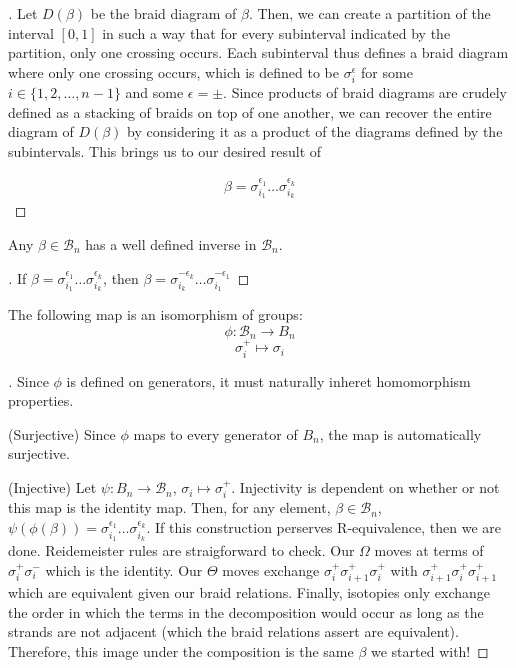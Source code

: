 \noindent \begin{proof}[\cite{Kassel}] Let $D(\beta)$ be the braid diagram of $\beta$. Then, we can create a partition of the interval $[0,1]$ in such a way that for every subinterval indicated by the partition, only one crossing occurs. Each subinterval thus defines a braid diagram where only one crossing occurs, which is defined to be $\sigma_i^\epsilon$ for some $i\in\{1,2,\hdots,n-1\}$ and some $\epsilon = \pm$. Since products of braid diagrams are crudely defined as a stacking of braids on top of one another, we can recover the entire diagram of $D(\beta)$ by considering it as a product of the diagrams defined by the subintervals. This brings us to our desired result of 

\begin{equation}
\begin{aligned}
\beta = \sigma^{\epsilon_1}_{i_1}\hdots\sigma^{\epsilon_k}_{i_k}  
\end{aligned}
\end{equation}
\end{proof}

\begin{corrolary}
	Any $\beta\in\mathcal{B}_n$ has a well defined inverse in $\mathcal{B}_n$.
\end{corrolary}

\noindent\begin{proof}[\cite{Kassel}] If $\beta = \sigma^{\epsilon_1}_{i_1}\hdots\sigma^{\epsilon_k}_{i_k}$, then $\beta = \sigma^{-\epsilon_k}_{i_k}\hdots\sigma^{-\epsilon_1}_{i_1}$ \end{proof} 

\begin{theorem}
	The following map is an isomorphism of groups:
$$\phi:\mathcal{B}_n\rightarrow B_n$$
$$\sigma_i^+ \mapsto \sigma_i$$
\end{theorem}

\noindent\begin{proof}[\cite{Kassel}] Since $\phi$ is defined on generators, it must naturally inheret homomorphism properties. 

(Surjective) Since $\phi$ maps to every generator of $B_n$, the map is automatically surjective.

(Injective) Let $\psi:B_n\rightarrow\mathcal{B}_n$, $\sigma_i\mapsto\sigma_i^+$. Injectivity is dependent on whether or not this map is the identity map. Then, for any element, $\beta\in\mathcal{B}_n$, $\psi(\phi(\beta)) = \sigma^{\epsilon_1}_{i_1}\hdots\sigma^{\epsilon_k}_{i_k}$. If this construction perserves R-equivalence, then we are done. Reidemeister rules are straigforward to check. Our $\Omega$ moves at terms of $\sigma_i^+\sigma_i^-$ which is the identity. Our $\Theta$ moves exchange $\sigma_i^+\sigma_{i+1}^+\sigma_i^+$ with $\sigma_{i+1}^+\sigma_i^+\sigma_{i+1}^+$ which are equivalent given our braid relations. Finally, isotopies only exchange the order in which the terms in the decomposition would occur as long as the strands are not adjacent (which the braid relations assert are equivalent). Therefore, this image under the composition is the same $\beta$ we started with! \end{proof} 

